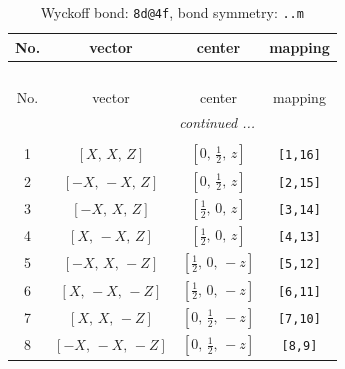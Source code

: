 \documentclass[fleqn,8pt]{jsarticle}
\begin{document}
\begin{longtable}{cccc}
\caption{Wyckoff bond: {\tt 8d@4f}, bond symmetry: {\tt ..m}}
 \\
 \hline \hline
No. & vector & center & mapping \\ \hline \endfirsthead

\multicolumn{3}{l}{\tablename\ \thetable{}} \\
 \hline \hline
No. & vector & center & mapping \\ \hline \endhead

 \hline \hline
\multicolumn{3}{r}{\footnotesize\it continued ...} \\ \endfoot

 \hline \hline
\multicolumn{3}{r}{} \\ \endlastfoot

1 & $\left[ X,\, X,\, Z \right]$ & $\left[ 0,\, \frac{1}{2},\, z \right]$ & {\tt [1,16]} \\ \hline
2 & $\left[ - X,\, - X,\, Z \right]$ & $\left[ 0,\, \frac{1}{2},\, z \right]$ & {\tt [2,15]} \\ \hline
3 & $\left[ - X,\, X,\, Z \right]$ & $\left[ \frac{1}{2},\, 0,\, z \right]$ & {\tt [3,14]} \\ \hline
4 & $\left[ X,\, - X,\, Z \right]$ & $\left[ \frac{1}{2},\, 0,\, z \right]$ & {\tt [4,13]} \\ \hline
5 & $\left[ - X,\, X,\, - Z \right]$ & $\left[ \frac{1}{2},\, 0,\, - z \right]$ & {\tt [5,12]} \\ \hline
6 & $\left[ X,\, - X,\, - Z \right]$ & $\left[ \frac{1}{2},\, 0,\, - z \right]$ & {\tt [6,11]} \\ \hline
7 & $\left[ X,\, X,\, - Z \right]$ & $\left[ 0,\, \frac{1}{2},\, - z \right]$ & {\tt [7,10]} \\ \hline
8 & $\left[ - X,\, - X,\, - Z \right]$ & $\left[ 0,\, \frac{1}{2},\, - z \right]$ & {\tt [8,9]} \\
\end{longtable}
\renewcommand{\arraystretch}{1.2}
\end{document}
